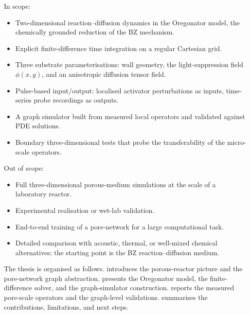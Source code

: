 In scope:
\begin{itemize}
    \item Two-dimensional reaction--diffusion dynamics in the Oregonator model, the chemically grounded reduction of the BZ mechanism.
    \item Explicit finite-difference time integration on a regular Cartesian grid.
    \item Three substrate parameterisations: wall geometry, the light-suppression field $\phi(x,y)$, and an anisotropic diffusion tensor field.
    \item Pulse-based input/output: localised activator perturbations as inputs, time-series probe recordings as outputs.
    \item A graph simulator built from measured local operators and validated against PDE solutions.
    \item Boundary three-dimensional tests that probe the transferability of the micro-scale operators.
\end{itemize}

Out of scope:
\begin{itemize}
    \item Full three-dimensional porous-medium simulations at the scale of a laboratory reactor.
    \item Experimental realisation or wet-lab validation.
    \item End-to-end training of a pore-network for a large computational task.
    \item Detailed comparison with acoustic, thermal, or well-mixed chemical alternatives; the starting point is the BZ reaction--diffusion medium.
\end{itemize}

The thesis is organised as follows.
 introduces the porous-reactor picture and the pore-network graph abstraction.
 presents the Oregonator model, the finite-difference solver, and the graph-simulator construction.
 reports the measured pore-scale operators and the graph-level validations.
 summarises the contributions, limitations, and next steps.
